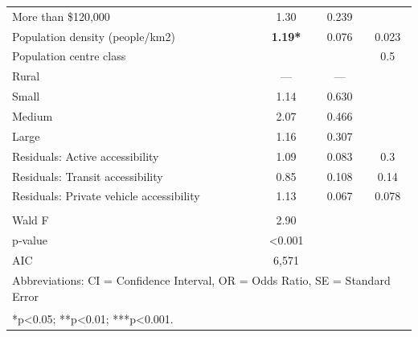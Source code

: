 \documentclass[preprint, 3p,
authoryear]{elsarticle} %
\providecommand{\DIFaddendFL}{} %
\DeclareRobustCommand{\DIFaddendFL}{\DIFOaddendFL \let\includegraphics\DIFOincludegraphics} %
\begin{document}
\begin{table}
\begin{tabular}[t]{lccc}
\addlinespace
\hspace{1em}More than \$120,000 & 1.30 & 0.239 & \\
Population density (people/km2) & \textbf{1.19*} & 0.076 & 0.023\\
Population centre class &  &  & 0.5\\
\hspace{1em}Rural & — & — & \\
\hspace{1em}Small & 1.14 & 0.630 & \\
\addlinespace
\hspace{1em}Medium & 2.07 & 0.466 & \\
\hspace{1em}Large & 1.16 & 0.307 & \\
Residuals: Active accessibility & 1.09 & 0.083 & 0.3\\
Residuals: Transit accessibility & 0.85 & 0.108 & 0.14\\
Residuals: Private vehicle accessibility & 1.13 & 0.067 & 0.078\\
\midrule\\
\addlinespace
Wald F & 2.90 &  & \\
p‑value & <0.001 &  & \\
AIC & 6,571 &  & \\
\bottomrule
\multicolumn{4}{l}{\rule{0pt}{1em}Abbreviations: CI = Confidence Interval, OR = Odds Ratio, SE = Standard Error}\\
\multicolumn{4}{l}{\textsuperscript{} *p<0.05; **p<0.01; ***p<0.001.}\\
\end{tabular}
\DIFaddendFL \end{table}

\renewcommand\refname{References}

\end{document}
